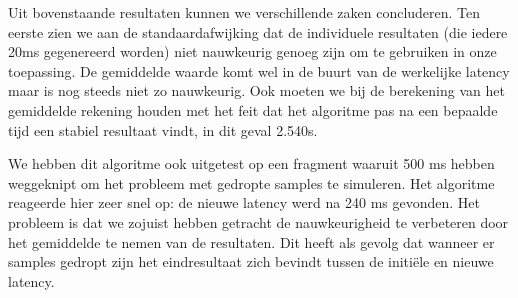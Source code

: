 Uit bovenstaande resultaten kunnen we verschillende zaken concluderen. Ten eerste zien we aan de standaardafwijking dat de individuele resultaten (die iedere 20ms gegenereerd worden) niet nauwkeurig genoeg zijn om te gebruiken in onze toepassing. De gemiddelde waarde komt wel in de buurt van de werkelijke latency maar is nog steeds niet zo nauwkeurig. Ook moeten we bij de berekening van het gemiddelde rekening houden met het feit dat het algoritme pas na een bepaalde tijd een stabiel resultaat vindt, in dit geval 2.540s.

We hebben dit algoritme ook uitgetest op een fragment waaruit 500 ms hebben weggeknipt om het probleem met gedropte samples te simuleren. Het algoritme reageerde hier zeer snel op: de nieuwe latency werd na 240 ms gevonden. Het probleem is dat we zojuist hebben getracht de nauwkeurigheid te verbeteren door het gemiddelde te nemen van de resultaten. Dit heeft als gevolg dat wanneer er samples gedropt zijn het eindresultaat zich bevindt tussen de initiële en nieuwe latency.

